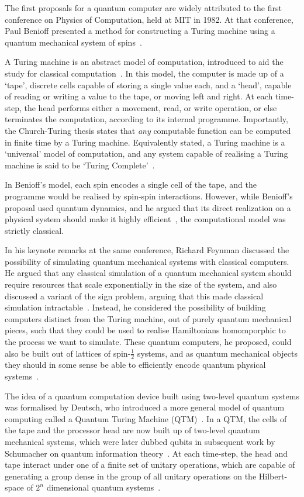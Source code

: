 The first proposals for a quantum computer are widely attributed to the first conference on Physics of Computation, held at MIT in 1982. At that conference, Paul Benioff presented a method for constructing a Turing machine using a quantum mechanical system of spins~\cite{Benioff1980}.\par
A Turing machine is an abstract model of computation, introduced to aid the study for classical computation~\cite{Nielsen2000}. In this model, the computer is made up of a `tape', discrete cells capable of storing a single value each, and a `head', capable of reading or writing a value to the tape, or moving left and right. At each time-step, the head performs either a movement, read, or write operation, or else terminates the computation, according to its internal programme. Importantly, the Church-Turing thesis states that \emph{any} computable function can be computed in finite time by a Turing machine. Equivalently stated, a Turing machine is a `universal' model of computation, and any system capable of realising a Turing machine is said to be `Turing Complete'~\cite{Nielsen2000}.\par
In Benioff's model, each spin encodes a single cell of the tape, and the programme would be realised by spin-spin interactions. However, while Benioff's proposal used quantum dynamics, and he argued that its direct realization on a physical system should make it highly efficient~\cite{Benioff1980}, the computational model was strictly classical.\par
In his keynote remarks at the same conference, Richard Feynman discussed the possibility of simulating quantum mechanical systems with classical computers. He argued that any classical simulation of a quantum mechanical system should require resources that scale exponentially in the size of the system, and also discussed a variant of the sign problem, arguing that this made classical simulation intractable~\cite{Feynman1982}. Instead, he considered the possibility of building computers distinct from the Turing machine, out of purely quantum mechanical pieces, such that they could be used to realise Hamiltonians homomporphic to the process we want to simulate. These quantum computers, he proposed, could also be built out of lattices of spin-$\frac{1}{2}$ systems, and as quantum mechanical objects they should in some sense be able to efficiently encode quantum physical systems~\cite{Feynman1982}.\par
The idea of a quantum computation device built using two-level quantum systems was formalised by Deutsch, who introduced a more general model of quantum computing called a Quantum Turing Machine (QTM)~\cite{Deutsch1985}. In a QTM, the cells of the tape and the processor head are now built up of two-level quantum mechanical systems, which were later dubbed qubits in subsequent work by Schumacher on quantum information theory~\cite{Schumacher1995}. At each time-step, the head and tape interact under one of a finite set of unitary operations, which are capable of generating a group dense in the group of all unitary operations on the Hilbert-space of $2^{n}$ dimensional quantum systems~\cite{Deutsch1985}.\par
